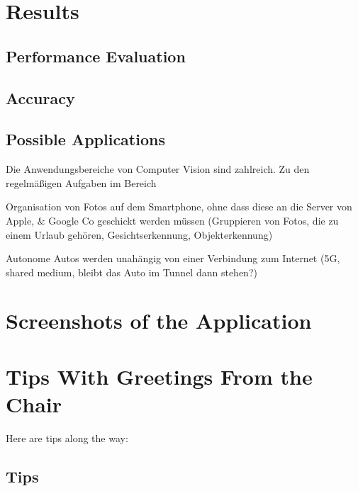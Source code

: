\documentclass[
			   fontsize=11pt,
               paper=a4,
               bibliography=totoc,
               idxtotoc,
               headsepline,
               footsepline,
               footinclude=false,
               BCOR=12mm,
               DIV=13,
               openany,   %
               ]
               {scrbook}
\begin{document}
\chapter{Results}

\section{Performance Evaluation}

\section{Accuracy}

\section{Possible Applications} %

Die Anwendungsbereiche von Computer Vision sind zahlreich. Zu den regelmäßigen Aufgaben im Bereich 

Organisation von Fotos auf dem Smartphone, ohne dass diese an die Server von Apple, \& Google Co geschickt werden müssen (Gruppieren von Fotos, die zu einem Urlaub gehören, Gesichtserkennung, Objekterkennung)

Autonome Autos werden unahängig von einer Verbindung zum Internet (5G, shared medium, bleibt das Auto im Tunnel dann stehen?)





\appendix

\chapter{Screenshots of the Application}

\chapter{Tips With Greetings From the Chair}
\label{sec:tips}       %
Here are tips along the way:

\section{Tips}
\end{document}

